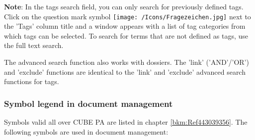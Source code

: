 \textbf{Note}: In the tags search field, you can only search for previously defined tags. Click on the question mark symbol \texttt{[image: /Icons/Fragezeichen.jpg]} next to the 'Tags' column title and a window appears with a list of tag categories from which tags can be selected. To search for terms that are not defined as tags, use the full text search.

\vspace{\baselineskip}

The advanced search function also works with dossiers. The 'link' ('AND'/'OR') and 'exclude' functions are identical to the 'link' and 'exclude' advanced search functions for tags. 

\subsubsection{Symbol legend in document management}

Symbols valid all over CUBE PA are listed in chapter \ref{bkm:Ref443039356}. The following symbols are used in document management:


